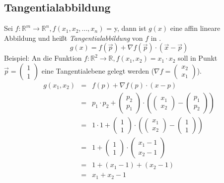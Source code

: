 \documentclass[a4paper,11pt]{article}
\begin{document}
	\subsection{Tangentialabbildung} %
	\label{sub:tangentialabbildung}
	Sei $f : \mathbb{R}^m \rightarrow \mathbb{R}^n, f(x_1,x_2,...,x_n)$ = y, dann ist $g(x)$ eine affin lineare Abbildung und heißt
	\emph{Tangentialabbildung} von $f$ in .
	\begin{equation}
		g(x) = f(\overrightarrow{p}) + \nabla f(\overrightarrow{p})\cdot(\overrightarrow{x}-\overrightarrow{p})
	\end{equation}
	Beispiel: An die Funktion $f : \mathbb{R}^2 \rightarrow \mathbb{R}, f(x_1,x_2) = x_1 \cdot x_2$ soll in Punkt $\overrightarrow{p} = 
	\left(\begin{array}{c}1\\1\end{array}\right)$ eine Tangentialebene gelegt werden 
	($\nabla f = \left(\begin{array}{c}x_2\\x_1\end{array}\right)$). 
	\begin{eqnarray*}
		g(x_1,x_2) &=& f(p) + \nabla f(p) \cdot (x-p) \\
		&=& p_1\cdot p_2 + \left(\begin{array}{c}p_2\\p_1\end{array}\right) \cdot
		 \left(\left(\begin{array}{c}x_1\\x_2\end{array}\right) - \left(\begin{array}{c}p_1\\p_2\end{array}\right) \right) \\
		&=& 1 \cdot 1 + \left(\begin{array}{c}1\\1\end{array}\right) \cdot \left(\left(\begin{array}{c}x_1\\x_2\end{array}\right)
		 - \left(\begin{array}{c}1\\1\end{array}\right) \right) \\
		&=& 1 + \left(\begin{array}{c}1\\1\end{array}\right) \cdot \left(\begin{array}{c}x_1 - 1\\x_2 - 1\end{array}\right) \\
		&=& 1+(x_1-1)+(x_2-1) \\
		&=& x_1 + x_2 -1
	\end{eqnarray*}
	
\end{document}

